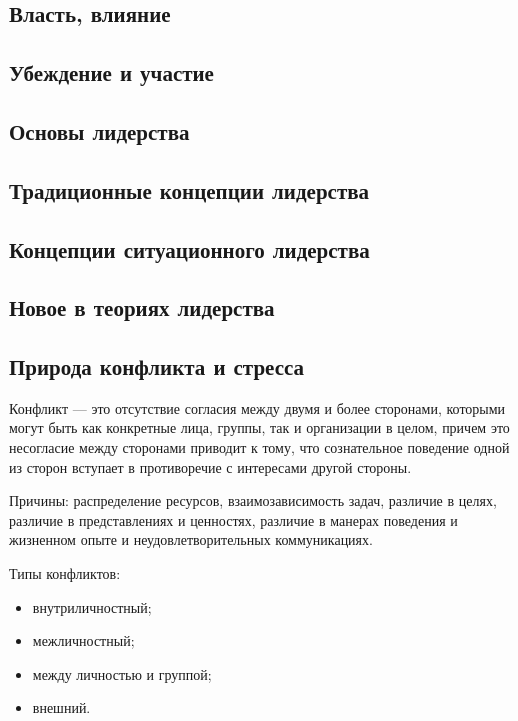 \documentclass[a4paper,12pt,oneside,final]{extarticle}
\numberwithin{equation}{section}
\begin{document}
\subsection{Власть, влияние}

\subsection{Убеждение и участие}

\subsection{Основы лидерства}

\subsection{Традиционные концепции лидерства}

\subsection{Концепции ситуационного лидерства}

\subsection{Новое в теориях лидерства}

\subsection{Природа конфликта и стресса}
Конфликт --- это отсутствие согласия между двумя и более сторонами, которыми могут быть как конкретные лица, группы, так и организации в целом, причем это несогласие между сторонами приводит к тому, что сознательное поведение одной из сторон вступает в противоречие с интересами другой стороны.

Причины: распределение ресурсов, взаимозависимость задач, различие в целях, различие в представлениях и ценностях, различие в манерах поведения и жизненном опыте и неудовлетворительных коммуникациях.

Типы конфликтов:
\begin{itemize}
	\item внутриличностный;
	\item межличностный;
	\item между личностью и группой;
	\item внешний.
\end{itemize}
\end{document}
